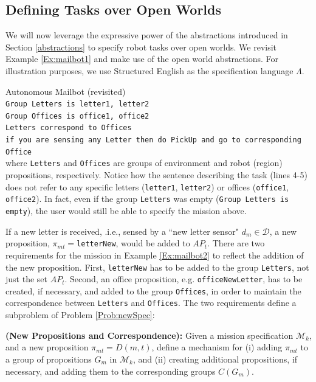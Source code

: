 \subsection{Defining Tasks over Open Worlds}

We will now leverage the expressive power of the abstractions introduced in Section \ref{abstractions} to specify robot tasks over open worlds. We revisit Example \ref{Ex:mailbot1} and make use of the open world abstractions. For illustration purposes, we use Structured English \cite{JFRKGICRA12} as the specification language $\Lambda$.

\begin{myExample}\label{Ex:mailbot2} Autonomous Mailbot (revisited)\\
\texttt{Group Letters is letter1, letter2}\\
\texttt{Group Offices is office1, office2}\\
\texttt{Letters correspond to Offices}\\
\texttt{if you are sensing any Letter then do PickUp and go to corresponding Office}\\ 
where \texttt{Letters} and \texttt{Offices} are groups of environment and robot (region) propositions, respectively. Notice how the sentence describing the task (lines 4-5) does not refer to any specific letters (\texttt{letter1}, \texttt{letter2}) or offices (\texttt{office1}, \texttt{office2}). In fact, even if the group \texttt{Letters} was empty (\texttt{Group Letters is empty}), the user would still be able to specify the mission above.
\end{myExample}

If a new letter is received, .i.e., sensed by a ``new letter sensor" $d_{m} \in \mathcal{D}$, a new proposition, $\pi_{mt} = $\texttt{letterNew}, would be added to $AP_t$. There are two requirements for the mission in Example \ref{Ex:mailbot2} to reflect the addition of the new proposition. First, \texttt{letterNew} has to be added to the group \texttt{Letters}, not just the set $AP_t$. Second, an office proposition, e.g. \texttt{officeNewLetter}, has to be created, if necessary, and added to the group \texttt{Offices}, in order to maintain the correspondence between \texttt{Letters} and \texttt{Offices}. The two requirements define a subproblem of Problem \ref{Prob:newSpec}:

\begin{myProblem}\label{Prob:correspondence}
	\textbf{(New Propositions and Correspondence):} Given a mission specification $\mathcal{M}_k$, and a new proposition $\pi_{mt} = D(m, t)$, define a mechanism for (i) adding $\pi_{mt}$ to a group of propositions $G_m$ in $\mathcal{M}_k$, and (ii) creating additional propositions, if necessary, and adding them to the corresponding groups $C(G_m)$.
\end{myProblem}


